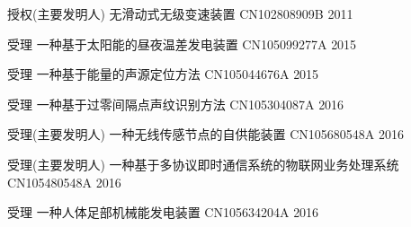 




\begin{cvhonors}

\cvhonor
{授权(主要发明人)} %
{无滑动式无级变速装置} %
{CN102808909B} %
{2011} %


\cvhonor
{受理} %
{一种基于太阳能的昼夜温差发电装置} %
{CN105099277A} %
{2015} %

\cvhonor
{受理} %
{一种基于能量的声源定位方法} %
{CN105044676A} %
{2015} %

\cvhonor
{受理} %
{一种基于过零间隔点声纹识别方法} %
{ CN105304087A} %
{2016} %
    
\cvhonor
{受理(主要发明人)} %
{一种无线传感节点的自供能装置} %
{ CN105680548A} %
{2016} %

\cvhonor
{受理(主要发明人)} %
{一种基于多协议即时通信系统的物联网业务处理系统} %
{ CN105480548A} %
{2016} %







\cvhonor
{受理} %
{一种人体足部机械能发电装置} %
{CN105634204A} %
{2016} %


\end{cvhonors}